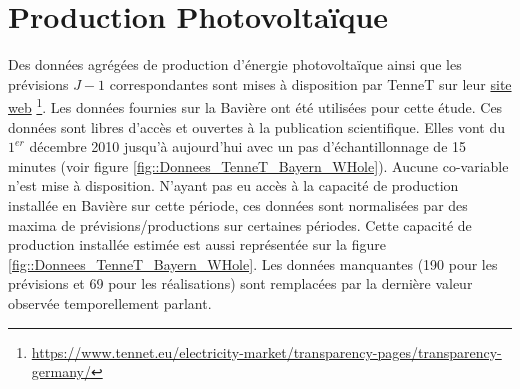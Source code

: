 \documentclass[12pt, french]{report}
\begin{document}
\section{Production Photovoltaïque}
\label{sec:Data_PV}
Des données agrégées de production d'énergie photovoltaïque ainsi que les prévisions $J-1$ correspondantes sont mises à disposition par TenneT sur leur \href{https://www.tennet.eu/electricity-market/transparency-pages/transparency-germany/}{site web} \footnote{\url{https://www.tennet.eu/electricity-market/transparency-pages/transparency-germany/}}. Les données fournies sur la Bavière ont été utilisées pour cette étude. Ces données sont libres d'accès et ouvertes à la publication scientifique. Elles vont du $1^{er}$ décembre 2010 jusqu'à aujourd'hui avec un pas d'échantillonnage de 15 minutes (voir figure \ref{fig::Donnees_TenneT_Bayern_WHole}). Aucune co-variable n'est mise à disposition. N'ayant pas eu accès à la capacité de production installée en Bavière sur cette période, ces données sont normalisées par des maxima de prévisions/productions sur certaines périodes. Cette capacité de production installée estimée est aussi représentée sur la figure \ref{fig::Donnees_TenneT_Bayern_WHole}. Les données manquantes (190 pour les prévisions et 69 pour les réalisations) sont remplacées par la dernière valeur observée temporellement parlant. 
\end{document}
